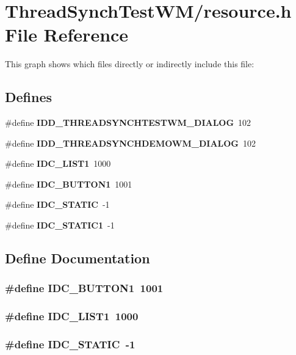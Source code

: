 \section{Thread\-Synch\-Test\-WM/resource.h File Reference}
\label{resource_8h}


This graph shows which files directly or indirectly include this file:\subsection*{Defines}
\begin{CompactItemize}
\item 
\#define {\bf IDD\_\-THREADSYNCHTESTWM\_\-DIALOG}~102
\item 
\#define {\bf IDD\_\-THREADSYNCHDEMOWM\_\-DIALOG}~102
\item 
\#define {\bf IDC\_\-LIST1}~1000
\item 
\#define {\bf IDC\_\-BUTTON1}~1001
\item 
\#define {\bf IDC\_\-STATIC}~-1
\item 
\#define {\bf IDC\_\-STATIC1}~-1
\end{CompactItemize}


\subsection{Define Documentation}
\subsubsection{\setlength{\rightskip}{0pt plus 5cm}\#define IDC\_\-BUTTON1~1001}\label{resource_8h_cfb35c4efbc593430638b09db17f2870}


\subsubsection{\setlength{\rightskip}{0pt plus 5cm}\#define IDC\_\-LIST1~1000}\label{resource_8h_5efa2881a956887640393d54b5650167}


\subsubsection{\setlength{\rightskip}{0pt plus 5cm}\#define IDC\_\-STATIC~-1}\label{resource_8h_c93033490bc8943cfc82ec3b40e5cd74}


